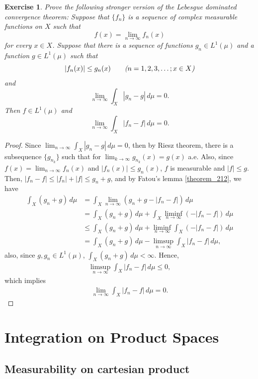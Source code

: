\documentclass[11pt]{book}
\newtheorem{exercise}{Exercise}[chapter]
\theoremstyle{definition}
\numberwithin{equation}{chapter}
\begin{document}
\begin{exercise}
Prove the following stronger version of the
Lebesgue dominated convergence theorem: Suppose that $\{ f_n\}$ is a sequence of complex measurable functions on $X$ such that
$$
f(x)=\lim_{n\to\infty} f_n(x)
$$
for every $x\in X$. Suppose that there is a sequence of functions
$g_n\in L^1(\mu)$ and a function $g\in L^1(\mu)$ such that
$$
\left|f_n(x)\right|\leq g_n(x)
\qquad
\mbox{{\em (}$n=1,2,3,\dots; x\in X${\em )}}
$$
and
$$
\lim_{n\to\infty} \int_X|g_n-g|\, d\mu = 0.
$$
Then $f\in L^1(\mu)$ and
$$
\lim_{n\to\infty} \int_X|f_n-f|\, d\mu = 0.
$$
\end{exercise}
\begin{proof} 
Since $\lim_{n\to\infty} \int_X |g_n - g|\, d\mu = 0$, then by Riesz theorem, there is a subsequence $\{g_{n_k}\}$ such that for $\lim_{k\to\infty} g_{n_k}(x) = g(x)$ a.e. Also, since $f(x) = \lim_{n\to\infty} f_n(x)$ and $\left|f_n(x)\right|\leq g_n(x)$, $f$ is measurable and $\left|f\right| \leq g$. Then, $\left|f_n - f\right| \leq \left|f_n\right| + \left|f\right| \leq g_n + g$, and by Fatou's lemma \ref{theorem_212}, we have
\begin{align*}
    \int_X (g_n + g)\, d\mu & = \int_X \lim_{n\to\infty} (g_n + g - \left|f_n - f\right|)\, d\mu \\
    & = \int_X (g_n + g)\, d\mu + \int_X \liminf_{n\to\infty} (-\left|f_n - f\right|)\, d\mu \\
    & \leq \int_X (g_n + g)\, d\mu + \liminf_{n\to\infty} \int_X (-\left|f_n - f\right|)\, d\mu \\
    & = \int_X (g_n + g)\, d\mu - \limsup_{n\to\infty} \int_X \left|f_n - f\right|\, d\mu,
\end{align*}
also, since $g, g_n \in L^1(\mu)$, $\int_X (g_n + g)\, d\mu < \infty$. Hence,
\begin{align*}
    \limsup_{n\to\infty} \int_X \left|f_n - f\right|\, d\mu \leq 0,
\end{align*}
which implies
\begin{align*}
    \lim_{n\to\infty} \int_X \left|f_n - f\right|\, d\mu = 0.
\end{align*}
\end{proof}


\medskip

\chapter{Integration on Product Spaces}

\section{Measurability on cartesian product}
\end{document}

